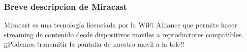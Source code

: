 \begin{frame}
  \frametitle{Breve descripcion de Miracast}
Miracast es una tecnología licenciada por la WiFi Alliance que permite hacer streaming de contenido desde
dispositivos moviles a reproductores compatibles.\\

¡¡Podemos transmitir la pantalla de nuestro movil a la tele!!
\end{frame}
